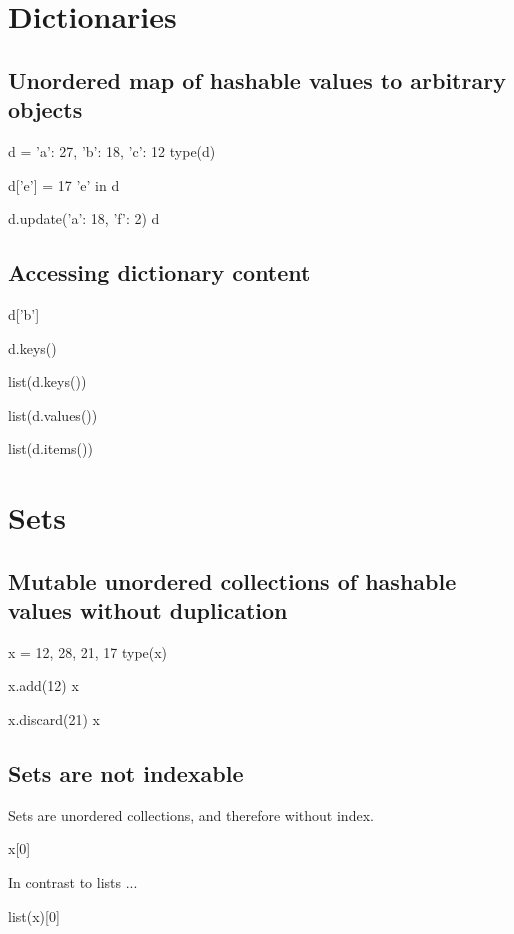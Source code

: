 \documentclass[aspectratio=1610,slidestop]{beamer}
\begin{document}
\section{Dictionaries}
\makeTableOfContentsSection

\subsection{Unordered map of hashable values to arbitrary objects}
\begin{pframe}
\begin{pyconsole}
d = {'a': 27, 'b': 18, 'c': 12}
type(d)

d['e'] = 17
'e' in d

d.update({'a': 18, 'f': 2})
d
\end{pyconsole}
\end{pframe}


\subsection{Accessing dictionary content}
\begin{pframe}
\vspace{-0.25cm}
\begin{pyconsole}
d['b']

d.keys()

list(d.keys())

list(d.values())

list(d.items())
\end{pyconsole}
\end{pframe}


\section{Sets}
\makeTableOfContentsSection

\subsection{Mutable unordered collections of hashable values without duplication}
\begin{pframe}
\begin{pyconsole}
x = {12, 28, 21, 17}
type(x)

x.add(12)
x

x.discard(21)
x
\end{pyconsole}
\end{pframe}

\subsection{Sets are not indexable}
\begin{pframe}
Sets are unordered collections, and therefore without index.
\begin{pyconsole}
x[0]
\end{pyconsole}
\medskip
\medskip

In contrast to lists ...
\begin{pyconsole}
list(x)[0]
\end{pyconsole}
\end{pframe}
\end{document}
